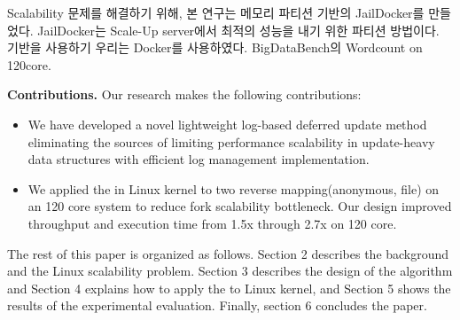 \fi



\ifkor
Scalability 문제를 해결하기 위해, 본 연구는 메모리 파티션 기반의 JailDocker를 만들었다. 
JailDocker는 Scale-Up server에서 최적의 성능을 내기 위한 파티션 방법이다. 
기반을 사용하기 우리는 Docker를 사용하였다. 
BigDataBench의 Wordcount on 120core.

\else


\fi

\ifkor

\textbf{Contributions.} Our research makes the following contributions:
\begin{itemize}
\item We have developed a novel lightweight log-based deferred update method
eliminating the sources of limiting performance scalability in update-heavy data
structures with efficient log management implementation.
\item 
We applied the in Linux kernel to two reverse mapping(anonymous, file) on
an 120 core system to reduce fork scalability bottleneck.
Our design improved throughput and execution time from 1.5x through 2.7x on 120 core.
\end{itemize}

\else

\fi


The rest of this paper is organized as follows.
Section 2 describes the background and the Linux scalability problem.
Section 3 describes the design of the algorithm and 
Section 4 explains how to apply the to Linux kernel, and
Section 5 shows the results of the experimental evaluation. 
Finally, section 6 concludes the paper.


